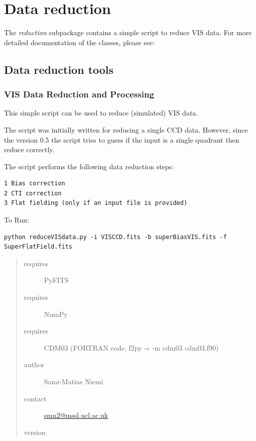 \documentclass[a4paper,11pt,english]{sphinxmanual}
\begin{document}
\chapter{Data reduction}
\label{index:data-reduction}
The \emph{reduction} subpackage contains a simple script to reduce VIS data. For more detailed documentation
of the classes, please see:


\section{Data reduction tools}
\label{reduction:module-reduction.reduceVISdata}\label{reduction::doc}\label{reduction:data-reduction-tools}

\subsection{VIS Data Reduction and Processing}
\label{reduction:vis-data-reduction-and-processing}
This simple script can be used to reduce (simulated) VIS data.

The script was initially written for reducing a single CCD data.
However, since the version 0.5 the script tries to guess if the
input is a single quadrant then reduce correctly.

The script performs the following data reduction steps:

\begin{Verbatim}[commandchars=\\\{\}]
1 Bias correction
2 CTI correction
3 Flat fielding (only if an input file is provided)
\end{Verbatim}

To Run:

\begin{Verbatim}[commandchars=\\\{\}]
python reduceVISdata.py -i VISCCD.fits -b superBiasVIS.fits -f SuperFlatField.fits
\end{Verbatim}
\begin{quote}\begin{description}
\item[{requires}] \leavevmode
PyFITS

\item[{requires}] \leavevmode
NumPy

\item[{requires}] \leavevmode
CDM03 (FORTRAN code, f2py -c -m cdm03 cdm03.f90)

\item[{author}] \leavevmode
Sami-Matias Niemi

\item[{contact}] \leavevmode
\href{mailto:smn2@mssl.ucl.ac.uk}{smn2@mssl.ucl.ac.uk}

\item[{version}] 

\end{description}\end{quote}
\end{document}
